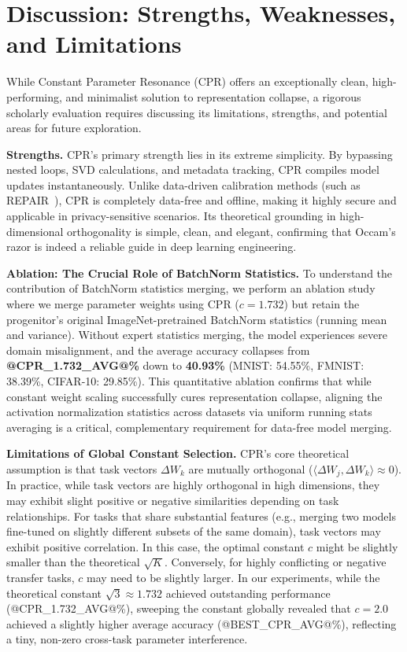 \documentclass{article}
\theoremstyle{plain}
\theoremstyle{definition}
\theoremstyle{remark}
\begin{document}
\section{Discussion: Strengths, Weaknesses, and Limitations}
\label{sec:discussion}

While Constant Parameter Resonance (CPR) offers an exceptionally clean, high-performing, and minimalist solution to representation collapse, a rigorous scholarly evaluation requires discussing its limitations, strengths, and potential areas for future exploration.

\textbf{Strengths.} CPR's primary strength lies in its extreme simplicity. By bypassing nested loops, SVD calculations, and metadata tracking, CPR compiles model updates instantaneously. Unlike data-driven calibration methods (such as REPAIR~\cite{jordan2023repair}), CPR is completely data-free and offline, making it highly secure and applicable in privacy-sensitive scenarios. Its theoretical grounding in high-dimensional orthogonality is simple, clean, and elegant, confirming that Occam's razor is indeed a reliable guide in deep learning engineering.

\textbf{Ablation: The Crucial Role of BatchNorm Statistics.} To understand the contribution of BatchNorm statistics merging, we perform an ablation study where we merge parameter weights using CPR ($c=1.732$) but retain the progenitor's original ImageNet-pretrained BatchNorm statistics (running mean and variance). Without expert statistics merging, the model experiences severe domain misalignment, and the average accuracy collapses from \textbf{@CPR_1.732_AVG@\%} down to \textbf{40.93\%} (MNIST: 54.55\%, FMNIST: 38.39\%, CIFAR-10: 29.85\%). This quantitative ablation confirms that while constant weight scaling successfully cures representation collapse, aligning the activation normalization statistics across datasets via uniform running stats averaging is a critical, complementary requirement for data-free model merging.

\textbf{Limitations of Global Constant Selection.} CPR's core theoretical assumption is that task vectors $\Delta W_k$ are mutually orthogonal ($\langle \Delta W_j, \Delta W_k \rangle \approx 0$). In practice, while task vectors are highly orthogonal in high dimensions, they may exhibit slight positive or negative similarities depending on task relationships. For tasks that share substantial features (e.g., merging two models fine-tuned on slightly different subsets of the same domain), task vectors may exhibit positive correlation. In this case, the optimal constant $c$ might be slightly smaller than the theoretical $\sqrt{K}$. Conversely, for highly conflicting or negative transfer tasks, $c$ may need to be slightly larger. In our experiments, while the theoretical constant $\sqrt{3} \approx 1.732$ achieved outstanding performance (@CPR_1.732_AVG@\%), sweeping the constant globally revealed that $c = 2.0$ achieved a slightly higher average accuracy (@BEST_CPR_AVG@\%), reflecting a tiny, non-zero cross-task parameter interference. 
\end{document}
